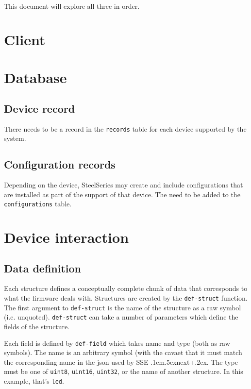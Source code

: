 \documentclass[12pt]{article}
\def\SSEnext{SSE\kern-.1em\lower.5ex\hbox{\footnotesize next}\kern+.2ex}
\begin{document}
This document will explore all three in order.


\section{Client}



\section{Database}

\subsection{Device record}

There needs to be a record in the \verb|records| table for each device
supported by the system.

\subsection{Configuration records}

Depending on the device, SteelSeries may create and include
configurations that are installed as part of the support of that
device. The need to be added to the \verb|configurations| table.



\section{Device interaction}



\subsection{Data definition}
\label{sec:datadefinition}

Each structure defines a conceptually complete chunk of data that
corresponds to what the firmware deals with.  Structures are created
by the \verb|def-struct| function. The first argument to
\verb|def-struct| is the name of the structure as a raw symbol (i.e.
unquoted). \verb|def-struct| can take a number of parameters which
define the fields of the structure.

Each field is defined by \verb|def-field| which takes name and type
(both as raw symbols). The name is an arbitrary symbol (with the
cavaet that it must match the corresponding name in the json used by
\SSEnext. The type must be one of \verb|uint8|, \verb|uint16|,
\verb|uint32|, or the name of another structure. In this example,
that's \verb|led|.
\end{document}
